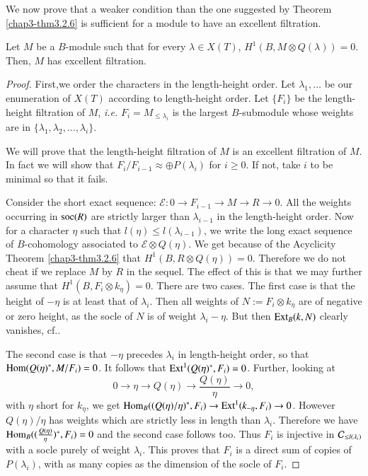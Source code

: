We now prove that a weaker condition than the one suggested by Theorem
\ref{chap3-thm3.2.6} is sufficient for a module to have an excellent
filtration. 

\begin{theorem}\label{chap3-thm3.2.7}
Let $M$ be a $B$-module such that for every $\lambda\in X(T)$,
$H^{1}(B,M\otimes Q(\lambda))=0$. Then, $M$ has excellent filtration.
\end{theorem}

\begin{proof}
First,\pageoriginale we\label{page30} order the characters in the length-height
order. Let $\lambda_{1},\ldots$ be our enumeration of $X(T)$ according
to length-height order. Let $\{F_{i}\}$ be the length-height
filtration of $M$, {\em i.e.} $F_{i}=M_{\leq \lambda_{i}}$ is the
largest $B$-submodule whose weights are in
$\{\lambda_{1},\lambda_{2},\ldots,\lambda_{i}\}$. 

We will prove that the length-height filtration of $M$ is an excellent
filtration of $M$. In fact we will show that $F_{i}/F_{i-1}\approx
\oplus P(\lambda_{i})$ for $i\geq 0$. If not, take $i$ to be minimal
so that it fails.

Consider the short exact sequence: $\mathcal{E}:0\to F_{i-1}\to M\to
R\to 0$. All the weights occurring in $\operatorname{soc}(R)$ are strictly larger
than $\lambda_{i-1}$ in the length-height order. Now for a character
$\eta$ such that $l(\eta)\leq l(\lambda_{i-1})$, we write the long
exact sequence of $B$-cohomology associated to $\mathcal{E}\otimes
Q(\eta)$. We get because of the Acyclicity Theorem
\ref{chap3-thm3.2.6} that $H^{1}(B,R\otimes Q(\eta))=0$. Therefore we
do not cheat if we replace $M$ by $R$ in the sequel. The effect of
this is that we may further assume that $H^{1}(B,F_{i}\otimes
k_{\eta})=0$. There are two cases. The first case is that the height
of $-\eta$ is at least that of $\lambda_{i}$. Then all weights of
$N:=F_{i}\otimes k_{\eta}$ are of negative or zero height, as the
socle of $N$ is of weight $\lambda_{i}-\eta$. But then $\operatorname{Ext}_{B}(k,N)$
clearly vanishes, cf.\@ \cite[II 4.10]{key11}.

The second case is that $-\eta$ precedes $\lambda_{i}$ in
length-height order, so that $\operatorname{Hom}(Q(\eta)^{*},M/F_{i})=0$. It follows
that $\operatorname{Ext}^{1}(Q(\eta)^{*},F_{i})=0$. Further, looking at
\begin{equation*}
0\to \eta\to Q(\eta)\to \frac{Q(\eta)}{\eta}\to 0,\tag{*}
\end{equation*}
with $\eta$ short for $k_{\eta}$, we get
$\operatorname{Hom}_{B}((Q(\eta)/\eta)^{*},F_{i})\to \operatorname{Ext}^{1}(k_{-\eta},F_{i})\to
0$. However $Q(\eta)/\eta$ has weights which are strictly less in
length than $\lambda_{i}$. Therefore we have
$\operatorname{Hom}_{B}((\frac{Q(\eta)}{\eta})^{*},F_{i})=0$ and the second case
follows too. Thus $F_{i}$ is injective in $\mathcal{C}_{\leq l(\lambda_{i})}$
with a socle purely of weight $\lambda_{i}$. This proves that $F_{i}$
is a direct sum of copies of $P(\lambda_{i})$, with as many copies as
the dimension of the socle of $F_{i}$.
\end{proof}


